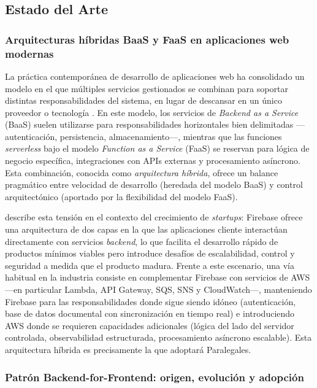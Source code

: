 \subsection{Estado del Arte}

\subsubsection{Arquitecturas híbridas BaaS y FaaS en aplicaciones web modernas}

La práctica contemporánea de desarrollo de aplicaciones web ha consolidado un modelo en el que múltiples servicios gestionados se combinan para soportar distintas responsabilidades del sistema, en lugar de descansar en un único proveedor o tecnología \cite{Newman2021}. En este modelo, los servicios de \textit{Backend as a Service} (BaaS) suelen utilizarse para responsabilidades horizontales bien delimitadas —autenticación, persistencia, almacenamiento—, mientras que las funciones \textit{serverless} bajo el modelo \textit{Function as a Service} (FaaS) se reservan para lógica de negocio específica, integraciones con APIs externas y procesamiento asíncrono. Esta combinación, conocida como \textit{arquitectura híbrida}, ofrece un balance pragmático entre velocidad de desarrollo (heredada del modelo BaaS) y control arquitectónico (aportado por la flexibilidad del modelo FaaS).

\textcite{Michael2021} describe esta tensión en el contexto del crecimiento de \textit{startups}: Firebase ofrece una arquitectura de dos capas en la que las aplicaciones cliente interactúan directamente con servicios \textit{backend}, lo que facilita el desarrollo rápido de productos mínimos viables pero introduce desafíos de escalabilidad, control y seguridad a medida que el producto madura. Frente a este escenario, una vía habitual en la industria consiste en complementar Firebase con servicios de AWS —en particular Lambda, API Gateway, SQS, SNS y CloudWatch—, manteniendo Firebase para las responsabilidades donde sigue siendo idóneo (autenticación, base de datos documental con sincronización en tiempo real) e introduciendo AWS donde se requieren capacidades adicionales (lógica del lado del servidor controlada, observabilidad estructurada, procesamiento asíncrono escalable). Esta arquitectura híbrida es precisamente la que adoptará Paralegales.

\subsubsection{Patrón Backend-for-Frontend: origen, evolución y adopción}

